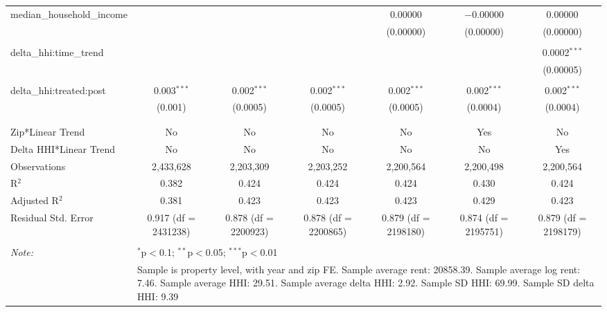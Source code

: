\begin{table}[H]
{\begin{tabular}{@{\extracolsep{5pt}}lcccccc}
  median\_household\_income &  &  &  & 0.00000 & $-$0.00000 & 0.00000 \\  

   &  &  &  & (0.00000) & (0.00000) & (0.00000) \\  

   & & & & & & \\  

  delta\_hhi:time\_trend &  &  &  &  &  & 0.0002$^{***}$ \\  

   &  &  &  &  &  & (0.00005) \\  

   & & & & & & \\  

  delta\_hhi:treated:post & 0.003$^{***}$ & 0.002$^{***}$ & 0.002$^{***}$ & 0.002$^{***}$ & 0.002$^{***}$ & 0.002$^{***}$ \\  

   & (0.001) & (0.0005) & (0.0005) & (0.0005) & (0.0004) & (0.0004) \\  

   & & & & & & \\  

 \hline \\[-1.8ex]  

 Zip*Linear Trend & No & No & No & No & Yes & No \\  

 Delta HHI*Linear Trend & No & No & No & No & No & Yes \\  

 Observations & 2,433,628 & 2,203,309 & 2,203,252 & 2,200,564 & 2,200,498 & 2,200,564 \\  

 R$^{2}$ & 0.382 & 0.424 & 0.424 & 0.424 & 0.430 & 0.424 \\  

 Adjusted R$^{2}$ & 0.381 & 0.423 & 0.423 & 0.423 & 0.429 & 0.423 \\  

 Residual Std. Error & 0.917 (df = 2431238) & 0.878 (df = 2200923) & 0.878 (df = 2200865) & 0.879 (df = 2198180) & 0.874 (df = 2195751) & 0.879 (df = 2198179) \\  

 \hline  

 \hline \\[-1.8ex]  

 \textit{Note:}  & \multicolumn{6}{l}{$^{*}$p$<$0.1; $^{**}$p$<$0.05; $^{***}$p$<$0.01} \\  

  & \multicolumn{6}{l}{Sample is property level, with year and zip FE. Sample average rent: 20858.39. Sample average log rent: 7.46. Sample average HHI: 29.51. Sample average delta HHI: 2.92. Sample SD HHI: 69.99. Sample SD delta HHI: 9.39} \\  

 \end{tabular}}  

 \end{table}  

